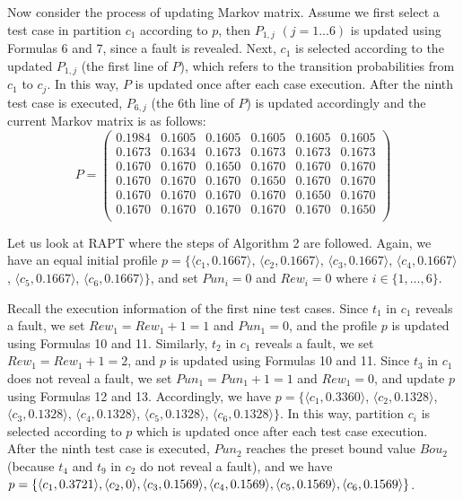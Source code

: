 \documentclass[10pt,journal,compsoc]{IEEEtran}
\begin{document}
Now consider the process of updating Markov matrix. Assume we first select a test case in partition $c_1$ according to $p$, then $P_{1,j}$ $(j = 1...6)$ is updated using Formulas 6 and 7, since a fault is revealed. Next, $c_1$ is selected according to the updated $P_{1,j}$ (the first line of $P$), which refers to the transition probabilities from $c_1$ to $c_j$. In this way, $P$ is updated once after each case execution. After the ninth test case is executed, $P_{6,j}$ (the 6th line of $P$) is updated accordingly and the current Markov matrix is as follows:
\begin{equation}
\label{eq:sixthmatrix}
P =
\begin{pmatrix}
	0.1984 & 0.1605  & 0.1605  & 0.1605  & 0.1605  & 0.1605 \\
	0.1673 & 0.1634  & 0.1673  & 0.1673  & 0.1673  & 0.1673  \\
	0.1670 & 0.1670  & 0.1650  & 0.1670  & 0.1670  & 0.1670  \\
    0.1670 & 0.1670  & 0.1670  & 0.1650  & 0.1670  & 0.1670  \\
    0.1670 & 0.1670  & 0.1670  & 0.1670  & 0.1650  & 0.1670  \\
    0.1670 & 0.1670  & 0.1670  & 0.1670  & 0.1670  & 0.1650  \\
\end{pmatrix}
\end{equation}

Let us look at RAPT where the steps of Algorithm 2 are followed. Again, we have an equal initial profile $p = \{\langle c_1, 0.1667 \rangle$, $\langle c_2, 0.1667\rangle$, $\langle c_3, 0.1667\rangle$, $\langle c_4, 0.1667\rangle$, $\langle c_5, 0.1667\rangle$, $\langle c_6, 0.1667\rangle\}$, and set $Pun_i = 0$ and $Rew_i = 0$ where $i \in \{1,\ldots,6\}$.

Recall the execution information of the first nine test cases. Since $t_1$ in $c_1$ reveals a fault, we set $Rew_1 = Rew_1 + 1 = 1$ and $Pun_1 = 0$, and the profile $p$ is updated using Formulas 10 and 11. Similarly, $t_2$ in $c_1$ reveals a fault, we set $Rew_1 = Rew_1 + 1 = 2$, and $p$ is updated using Formulas 10 and 11. Since $t_3$ in $c_1$ does not reveal a fault, we set $Pun_1 = Pun_1 + 1 = 1$ and $Rew_1 = 0$, and update $p$ using Formulas 12 and 13. Accordingly, we have $p = \{\langle c_1,0.3360\rangle$, $\langle c_2, 0.1328\rangle$, $\langle c_3, 0.1328\rangle$, $\langle c_4, 0.1328\rangle$, $\langle c_5, 0.1328\rangle$, $\langle c_6, 0.1328\rangle\}$. In this way, partition $c_i$ is selected according to $p$ which is updated once after each test case execution. After the ninth test case is executed, $Pun_2$ reaches the preset bound value $Bou_2$ (because $t_4$ and $t_9$ in $c_2$ do not reveal a fault), and we have $p = \{\langle c_1,0.3721 \rangle, \langle c_2, 0\rangle, \langle c_3, 0.1569 \rangle, \langle c_4, 0.1569 \rangle, \langle c_5, 0.1569 \rangle, \\ \langle c_6, 0.1569 \rangle\}$.
\end{document}
